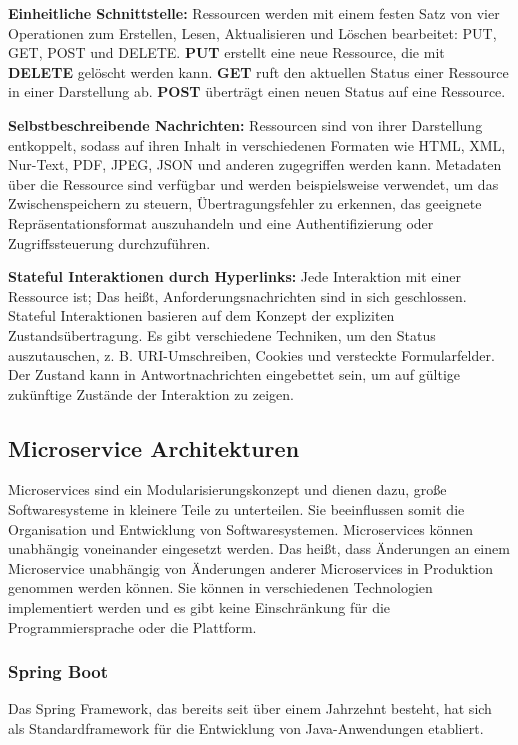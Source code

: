 \textbf{Einheitliche Schnittstelle:} Ressourcen werden mit einem festen Satz von vier Operationen zum Erstellen, Lesen, Aktualisieren und Löschen bearbeitet: PUT, GET, POST und DELETE. \textbf{PUT} erstellt eine neue Ressource, die mit \textbf{DELETE} gelöscht werden kann. \textbf{GET} ruft den aktuellen Status einer Ressource in einer Darstellung ab. \textbf{POST} überträgt einen neuen Status auf eine Ressource.

\textbf{Selbstbeschreibende Nachrichten:} Ressourcen sind von ihrer Darstellung entkoppelt, sodass auf ihren Inhalt in verschiedenen Formaten wie HTML, XML, Nur-Text, PDF, JPEG, JSON und anderen zugegriffen werden kann. Metadaten über die Ressource sind verfügbar und werden beispielsweise verwendet, um das Zwischenspeichern zu steuern, Übertragungsfehler zu erkennen, das geeignete Repräsentationsformat auszuhandeln und eine Authentifizierung oder Zugriffssteuerung durchzuführen.

\textbf{Stateful Interaktionen durch Hyperlinks:} Jede Interaktion mit einer Ressource ist; Das heißt, Anforderungsnachrichten sind in sich geschlossen. Stateful Interaktionen basieren auf dem Konzept der expliziten Zustandsübertragung. Es gibt verschiedene Techniken, um den Status auszutauschen, z. B. URI-Umschreiben, Cookies und versteckte Formularfelder. Der Zustand kann in Antwortnachrichten eingebettet sein, um auf gültige zukünftige Zustände der Interaktion zu zeigen.

\subsection{Microservice Architekturen}

Microservices sind ein Modularisierungskonzept und dienen dazu, große Softwaresysteme in kleinere Teile zu unterteilen. Sie beeinflussen somit die Organisation und Entwicklung von Softwaresystemen. Microservices können unabhängig voneinander eingesetzt werden. Das heißt, dass Änderungen an einem Microservice unabhängig von Änderungen anderer Microservices in Produktion genommen werden können. Sie können in verschiedenen Technologien implementiert werden und es gibt keine Einschränkung für die Programmiersprache oder die Plattform\cite[45--46]{wolff2016microservices}.

\subsubsection{Spring Boot}

Das Spring Framework, das bereits seit über einem Jahrzehnt besteht, hat sich als Standardframework für die Entwicklung von Java-Anwendungen etabliert.

